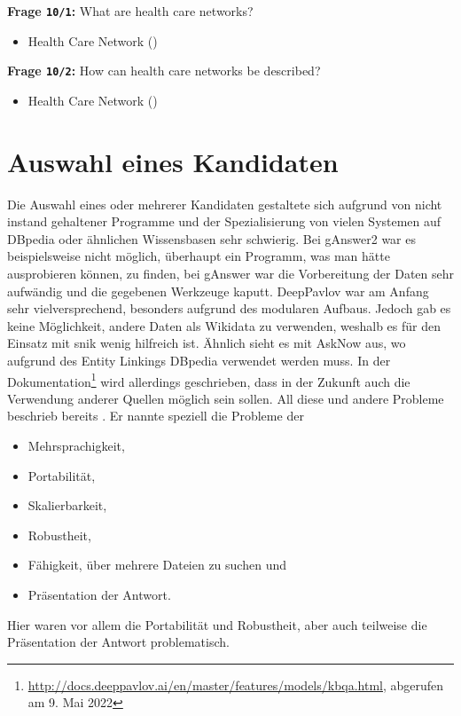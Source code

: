 \textbf{Frage \texttt{10/1}:} What are health care networks?

\begin{itemize}
  \item Health Care Network ()
\end{itemize}

\textbf{Frage \texttt{10/2}:} How can health care networks be described?

\begin{itemize}
  \item Health Care Network ()
\end{itemize}

\section{Auswahl eines Kandidaten}

Die Auswahl eines oder mehrerer Kandidaten gestaltete sich aufgrund von nicht instand gehaltener Programme
und der Spezialisierung von vielen Systemen auf DBpedia oder ähnlichen Wissensbasen sehr schwierig.
Bei gAnswer2 war es beispielsweise nicht möglich, überhaupt ein Programm, was man hätte ausprobieren können, zu finden,
bei gAnswer war die Vorbereitung der Daten sehr aufwändig und die gegebenen Werkzeuge kaputt.
DeepPavlov war am Anfang sehr vielversprechend, besonders aufgrund des modularen Aufbaus.
Jedoch gab es keine Möglichkeit, andere Daten als Wikidata zu verwenden, weshalb es für den Einsatz mit \ac{snik} wenig hilfreich ist.
Ähnlich sieht es mit AskNow aus, wo aufgrund des Entity Linkings DBpedia verwendet werden muss.
In der Dokumentation\footnote{\url{http://docs.deeppavlov.ai/en/master/features/models/kbqa.html}, abgerufen am 9. Mai 2022} wird allerdings geschrieben,
dass in der Zukunft auch die Verwendung anderer Quellen möglich sein sollen.
All diese und andere Probleme beschrieb bereits \citet{diefenbachkbqa}.
Er nannte speziell die Probleme der
\begin{itemize}
  \item Mehrsprachigkeit,
  \item Portabilität,
  \item Skalierbarkeit,
  \item Robustheit,
  \item Fähigkeit, über mehrere Dateien zu suchen und
  \item Präsentation der Antwort.
\end{itemize}
Hier waren vor allem die Portabilität und Robustheit, aber auch teilweise die Präsentation der Antwort problematisch.

